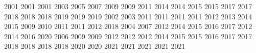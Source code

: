   2001 2001 2001 2003 2005 2007 2009 2009 2011 2014 2014 2015 2015 2017 2017
  2018 2018 2018 2019 2019 2019 2002 2003 2011 2011 2011 2011 2012 2013 2014
  2015 2009 2010 2011 2011 2012 2018 2004 2007 2012 2014 2015 2016 2017 2012
  2014 2016 2020 2006 2009 2009 2012 2012 2012 2014 2015 2015 2016 2017 2017
  2018 2018 2018 2018 2020 2020 2021 2021 2021 2021 2021
